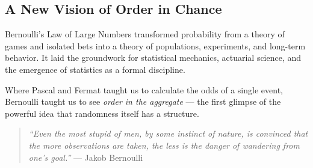 \subsection{A New Vision of Order in Chance}

Bernoulli's Law of Large Numbers transformed probability from a theory of games and isolated bets into a theory of populations, experiments, and long-term behavior. It laid the groundwork for statistical mechanics, actuarial science, and the emergence of statistics as a formal discipline.

Where Pascal and Fermat taught us to calculate the odds of a single event, Bernoulli taught us to see \textit{order in the aggregate} — the first glimpse of the powerful idea that randomness itself has a structure.

\begin{quote}
    \textit{``Even the most stupid of men, by some instinct of nature, is convinced that the more observations are taken, the less is the danger of wandering from one's goal.''} — Jakob Bernoulli
\end{quote}
